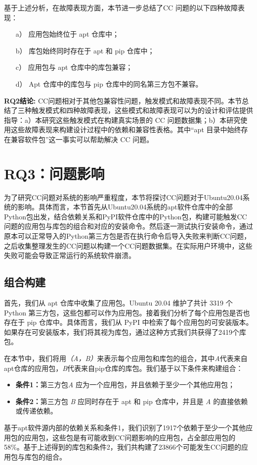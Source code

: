 基于上述分析，在故障表现方面，本节进一步总结了CC 问题的以下四种故障表现：
\begin{itemize}
	\item[a）] 应用包始终位于 apt 仓库中；
	\item[b）] 库包始终同时存在于 apt 和 pip 仓库中；
	\item[c）] 应用包与 apt 仓库中的库包兼容；
	\item[d）] Apt 仓库中的库包与 pip 仓库中的同名第三方包不兼容。
\end{itemize}


\begin{tcolorbox}[boxrule=1pt,boxsep=1pt,left=2pt,right=2pt,top=2pt,bottom=2pt]
	\small
	\textcolor{red}{} \noindent\textbf{RQ2结论:} 
	CC问题相对于其他包兼容性问题，触发模式和故障表现不同。本节总结了三种触发模式和四种故障表现，这些模式和故障表现可以为\tool{}的设计和评估提供指导：a）本研究这些触发模式在构建真实场景的 CC 问题数据集；b）本研究使用这些故障表现来构建\tool{}设计过程中的依赖和兼容性表格。其中“apt 目录中始终存在兼容软件包”这一事实可以帮助\tool{}解决 CC 问题。
\end{tcolorbox} 

\section{RQ3：问题影响}\label{3.4}
为了研究CC问题对系统的影响严重程度，本节将探讨CC问题对于Ubuntu20.04系统的影响。具体而言，本节首先从Ubuntu20.04系统的apt软件仓库中的全部Python包出发，结合依赖关系和PyPI软件仓库中的Python包，构建可能触发CC问题的应用包与库包的组合和对应的安装命令。然后逐一测试执行安装命令，通过原本可以正常导入的Python第三方包是否在执行命令后导入失败来判断CC问题，之后收集整理发生的CC问题以构建一个CC问题数据集。在实际用户环境中，这些失败可能会导致正常运行的系统软件崩溃。

\subsection{组合构建}
首先，我们从 apt 仓库中收集了应用包。Ubuntu 20.04 维护了共计 3319 个 Python 第三方包，这些包都可以作为应用包。接着我们分析了每个应用包是否也存在于 pip 仓库中。具体而言，我们从 PyPI 中检索了每个应用包的可安装版本。如果存在可安装版本，我们将其视为库包，通过这种方式我们共获得了2419个库包。

在本节中，我们将用\textit{（A，B）}来表示每个应用包和库包的组合，其中\textit{A}代表来自apt仓库的应用包，\textit{B}代表来自pip仓库的库包。我们基于以下条件来构建组合：
\begin{itemize}
	\item \textbf{条件1：}第三方包\textit{A} 应为一个应用包，并且依赖于至少一个其他应用包；
	\item \textbf{条件2：}第三方包 \textit{B} 应同时存在于 apt 和 pip 仓库中，并且是 \textit{A} 的直接依赖或传递依赖。
\end{itemize}
基于apt软件源内部的依赖关系和条件1，我们识别了1917个依赖于至少一个其他应用包的应用包，这些包是有可能收到CC问题影响的应用包，占全部应用包的58\%。基于上述得到的库包和条件2，我们共构建了23866个可能发生CC问题的应用包与库包的组合。

